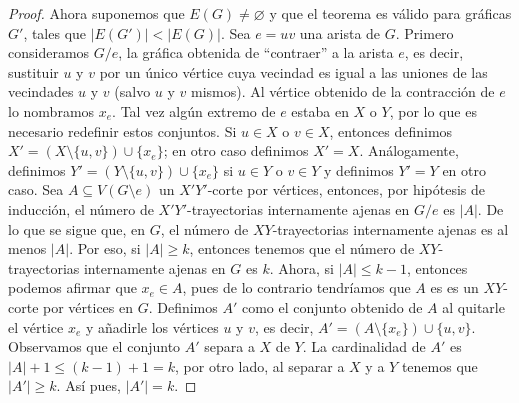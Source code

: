 \begin{proof}
    Ahora suponemos que $E(G) \neq \varnothing$ y que el teorema es v\'alido
    para gr\'aficas $G'$, tales que $|E(G')| < |E(G)|$. Sea $e = uv$ una arista
    de $G$. Primero consideramos $G/e$, la gr\'afica obtenida de ``contraer'' a
    la arista $e$, es decir, sustituir $u$ y $v$ por un \'unico v\'ertice cuya
    vecindad es igual a las uniones de las vecindades $u$ y $v$ (salvo $u$ y $v$
    mismos). Al v\'ertice obtenido de la contracci\'on de $e$ lo nombramos
    $x_e$. Tal vez alg\'un extremo de $e$ estaba en $X$ o $Y$, por lo que es
    necesario redefinir estos conjuntos. Si $u\in X$ o $v\in X$, entonces
    definimos $X'=(X \setminus \{u,v\}) \cup \{x_e\}$; en otro caso definimos
    $X'=X$. An\'alogamente, definimos $Y'= (Y \setminus \{u,v\}) \cup \{x_e\}$
    si $u \in Y$ o $v \in Y$ y definimos $Y'=Y$ en otro caso. Sea $A \subseteq
    V(G \setminus e)$ un $X'Y'$-corte por v\'ertices, entonces, por hip\'otesis
    de inducci\'on, el n\'umero de $X'Y'$-trayectorias internamente ajenas en
    $G/e$ es $|A|$. De lo que se sigue que, en $G$, el n\'umero de
    $XY$-trayectorias internamente ajenas es al menos $|A|$. Por eso, si $|A|
    \geq k$, entonces tenemos que el n\'umero de $XY$-trayectorias internamente
    ajenas en $G$ es $k$. Ahora, si $|A| \leq k-1$, entonces podemos afirmar que
    $x_e \in A$, pues de lo contrario tendr\'iamos que $A$ es es un $XY$-corte
    por v\'ertices en $G$. Definimos $A'$ como el conjunto obtenido de $A$ al
    quitarle el v\'ertice $x_e$ y a\~{n}adirle los v\'ertices $u$ y $v$, es
    decir, $A'=(A \setminus \{x_e\})\cup \{u,v\}$. Observamos que el conjunto
    $A'$ separa  a $X$ de $Y$. La cardinalidad de $A'$ es $|A|+1 \leq (k-1)+1=
    k$, por otro lado, al separar a $X$ y a $Y$ tenemos que $|A'| \geq k$. As\'i
    pues, $|A'|=k$.


\end{proof}

